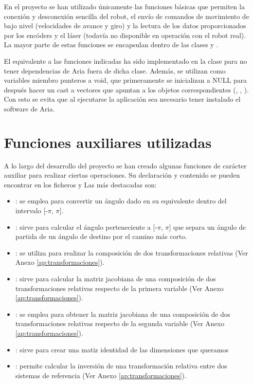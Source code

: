 En el proyecto se han utilizado únicamente las funciones básicas que permiten la conexión y desconexión sencilla del robot, el envío de comandos de movimiento de bajo nivel (velocidades de avance y giro) y la lectura de los datos proporcionados por los encóders y el láser (todavía no disponible en operación con el robot real). La mayor parte de estas funciones se encapsulan dentro de las clases  y .

El equivalente a las funciones indicadas ha sido implementado en la clase  para no tener dependencias de Aria fuera de dicha clase.
Además, se utilizan como variables miembro punteros a void, que primeramente se inicializan a NULL para después hacer un cast a vectores que apuntan a los objetos correspondientes (, , ). Con esto se evita que al ejecutarse la aplicación sea necesario tener instalado el software de Aria.

\section{Funciones auxiliares utilizadas}
A lo largo del desarrollo del proyecto se han creado algunas funciones de carácter auxiliar para realizar ciertas operaciones. Su declaración y contenido se pueden encontrar en los ficheros  y  Las más destacadas son:

\begin{itemize}
  \item {}: se emplea para convertir un ángulo dado en su equivalente dentro del intervalo
   [-$\pi$, $\pi$].
  \item {}: sirve para calcular el ángulo perteneciente a [-$\pi$, $\pi$] que separa un ángulo de partida de un ángulo de destino por el camino más corto.
  \item {}: se utiliza para realizar la composición de dos transformaciones relativas (Ver Anexo \ref{ap:transformaciones}).
  \item {}: sirve para calcular la matriz jacobiana de una composición de dos transformaciones relativas respecto de la primera variable  (Ver Anexo \ref{ap:transformaciones}).
  \item {}: se emplea para obtener la matriz jacobiana de una composición de dos transformaciones relativas respecto de la segunda variable  (Ver Anexo \ref{ap:transformaciones}).
  \item {}: sirve para crear una matiz identidad de las dimensiones que queramos
  \item {}: permite calcular la inversión de una transformación relativa entre dos sistemas de referencia  (Ver Anexo \ref{ap:transformaciones}).
\end{itemize}

